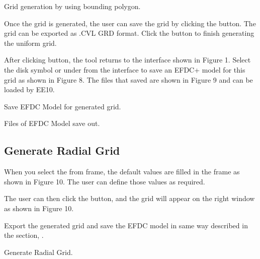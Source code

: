 \documentclass[letterpaper,10pt,english]{sphinxmanual}
\begin{document}

 Grid generation by using bounding polygon.

Once the grid is generated, the user can save the grid by clicking the
 button. The grid can be exported as \sphinxstyleemphasis{*}.CVL GRD
format. Click the  button to finish generating the uniform grid.

After clicking  button, the tool returns to the interface shown in
Figure 1. Select the disk symbol or  under  from the
interface to save an EFDC+ model for this grid as shown in Figure 8. The
files that saved are shown in Figure 9 and can be loaded by EE10.


 Save EFDC Model for generated grid.


 Files of EFDC Model save out.


\subsection{Generate Radial Grid}
\label{\detokenize{gridgen/radialgrid:generate-radial-grid}}\label{\detokenize{gridgen/radialgrid:radialgrid}}\label{\detokenize{gridgen/radialgrid::doc}}
When you select the  from  frame, the
default values are filled in the  frame as shown in
Figure 10. The user can define those values as required.

The user can then click the  button, and the grid will appear
on the right window as shown in Figure 10.

Export the generated grid and save the EFDC model in same way described
in the section, {\hyperref[\detokenize{gridgen/uniformgrid:uniformgrid}]{}}.


 Generate Radial Grid.
\end{document}
